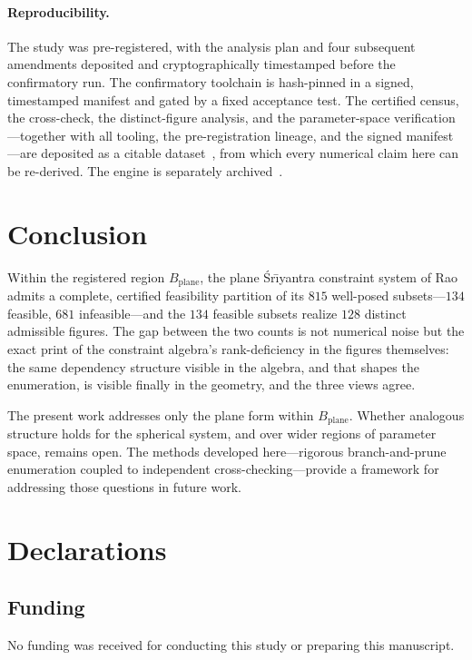 \documentclass[11pt]{article}
\newcommand{\sri}{\'Sr\={\i}yantra}
\newcommand{\Bplane}{B_{\mathrm{plane}}}
\begin{document}
\paragraph{Reproducibility.}
The study was pre-registered, with the analysis plan and four subsequent amendments deposited and cryptographically timestamped before the confirmatory run. The confirmatory toolchain is hash-pinned in a signed, timestamped manifest and gated by a fixed acceptance test. The certified census, the cross-check, the distinct-figure analysis, and the parameter-space verification---together with all tooling, the pre-registration lineage, and the signed manifest---are deposited as a citable dataset~\cite{Dataset}, from which every numerical claim here can be re-derived. The engine is separately archived~\cite{Engine}.

\section{Conclusion}

Within the registered region $\Bplane$, the plane \sri{} constraint system of Rao~\cite{Rao1998} admits a complete, certified feasibility partition of its $815$ well-posed subsets---$134$ feasible, $681$ infeasible---and the $134$ feasible subsets realize $128$ distinct admissible figures. The gap between the two counts is not numerical noise but the exact print of the constraint algebra's rank-deficiency in the figures themselves: the same dependency structure visible in the algebra, and that shapes the enumeration, is visible finally in the geometry, and the three views agree.

The present work addresses only the plane form within $\Bplane$. Whether analogous structure holds for the spherical system, and over wider regions of parameter space, remains open. The methods developed here---rigorous branch-and-prune enumeration coupled to independent cross-checking---provide a framework for addressing those questions in future work.

\section*{Declarations}

\subsection*{Funding}
No funding was received for conducting this study or preparing this manuscript.
\end{document}
